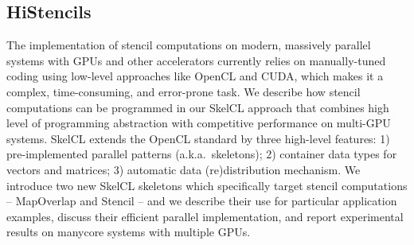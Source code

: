 \subsection{HiStencils}
The implementation of stencil computations on modern, massively parallel systems with GPUs and other accelerators currently relies on manually-tuned coding using low-level approaches like OpenCL and CUDA, which makes it a complex, time-consuming, and error-prone task.
We describe how stencil computations can be programmed in our SkelCL approach that combines high level of programming abstraction with competitive performance on multi-GPU systems.
SkelCL extends the OpenCL standard by three high-level features:
1) pre-implemented parallel patterns (a.k.a.\ skeletons);
2) container data types for vectors and matrices; 
3) automatic data (re)distribution mechanism.
We introduce two new SkelCL skeletons which specifically target stencil computations -- MapOverlap and Stencil -- and we describe their use for particular application examples, discuss their efficient parallel implementation, and report experimental results on manycore systems with multiple GPUs.

\pagebreak
